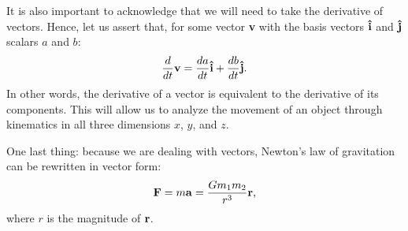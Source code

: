 It is also important to acknowledge that we will need to take the derivative of vectors. Hence, let us assert that, for some vector \textbf{v} with the basis vectors $\uvec{i}$ and $\uvec{j}$ scalars $a$ and $b$:
\begin{equation*}
	\frac{d}{dt}\bvec{v} = \frac{da}{dt}\uvec{i} + \frac{db}{dt}\uvec{j} \text{.}
\end{equation*}
In other words, the derivative of a vector is equivalent to the derivative of its components.
This will allow us to analyze the movement of an object through kinematics in all three dimensions $x$, $y$, and $z$.

\newpage

One last thing: because we are dealing with vectors, Newton's law of gravitation can be rewritten in vector form:
\begin{equation*}
	\bm{\mathbf{F}} = m\bm{\mathbf{a}} = \frac{Gm_1m_2}{r^3}\bm{\mathbf{r}} \text{,}
\end{equation*}
where $r$ is the magnitude of $\bm{\mathbf{r}}$.

